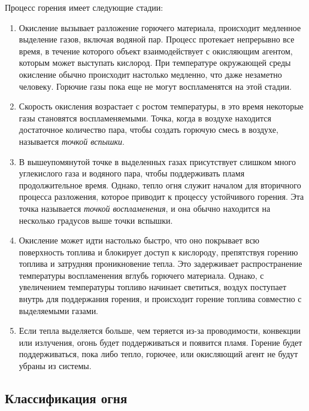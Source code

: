 Процесс горения имеет следующие стадии:
\begin{enumerate}
    \item Окисление вызывает разложение горючего материала, происходит\break{}
        медленное выделение газов, включая водяной пар.  Процесс протекает
        непрерывно все время, в течение которого объект взаимодействует с
        окисляющим агентом, которым может выступать кислород. При температуре
        окружающей среды окисление обычно происходит настолько медленно, что
        даже незаметно человеку. Горючие газы пока еще не могут воспламенятся на
        этой стадии.

    \item Скорость окисления возрастает с ростом температуры, в это время
        некоторые газы становятся воспламеняемыми. Точка, когда в воздухе
        находится достаточное количество пара, чтобы создать горючую смесь в
        воздухе, называется \emph{точкой вспышки}.

    \item В вышеупомянутой точке в выделенных газах присутствует слишком много
        углекислого газа и водяного пара, чтобы поддерживать пламя
        продолжительное время. Однако, тепло огня служит началом для вторичного
        процесса разложения, которое приводит к процессу устойчивого горения.
        Эта точка называется \emph{точкой воспламенения}, и она обычно находится
        на несколько градусов выше точки вспышки.

    \item Окисление может идти настолько быстро, что оно покрывает всю
        поверхность топлива и блокирует доступ к кислороду, препятствуя горению
        топлива и затрудняя проникновение тепла. Это задерживает распространение
        температуры воспламенения вглубь горючего материала. Однако, с
        увеличением температуры топливо начинает светиться, воздух поступает
        внутрь для поддержания горения, и происходит горение топлива совместно с
        выделяемыми газами.

    \item Если тепла выделяется больше, чем теряется из-за проводимости,
        конвекции или излучения, огонь будет поддерживаться и появится пламя.
        Горение будет поддерживаться, пока либо тепло, горючее, или окисляющий
        агент не будут убраны из системы.
\end{enumerate}

\subsection{Классификация огня}

